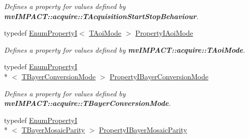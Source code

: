 \begin{DoxyCompactItemize}
\begin{DoxyCompactList}\small\item\em Defines a property for values defined by {\bfseries mv\+I\+M\+P\+A\+C\+T\+::acquire\+::\+T\+Acquisition\+Start\+Stop\+Behaviour}. \end{DoxyCompactList}\item 
\hypertarget{group___common_interface_gac29dd0ca928e4e97eeb1a038ddb4f2af}{typedef \hyperlink{classmv_i_m_p_a_c_t_1_1acquire_1_1_enum_property_i}{Enum\+Property\+I}$<$ \hyperlink{group___common_interface_gae7940d967323243f7d4ebdb5cc8045cb}{T\+Aoi\+Mode} $>$ \hyperlink{group___common_interface_gac29dd0ca928e4e97eeb1a038ddb4f2af}{Property\+I\+Aoi\+Mode}}\label{group___common_interface_gac29dd0ca928e4e97eeb1a038ddb4f2af}

\begin{DoxyCompactList}\small\item\em Defines a property for values defined by {\bfseries mv\+I\+M\+P\+A\+C\+T\+::acquire\+::\+T\+Aoi\+Mode}. \end{DoxyCompactList}\item 
\hypertarget{group___common_interface_ga0420d9b31df0caf0bc62286439e80366}{typedef \hyperlink{classmv_i_m_p_a_c_t_1_1acquire_1_1_enum_property_i}{Enum\+Property\+I}\\*
$<$ \hyperlink{group___common_interface_gab19b45fcaaa584be84a99a3d7098b055}{T\+Bayer\+Conversion\+Mode} $>$ \hyperlink{group___common_interface_ga0420d9b31df0caf0bc62286439e80366}{Property\+I\+Bayer\+Conversion\+Mode}}\label{group___common_interface_ga0420d9b31df0caf0bc62286439e80366}

\begin{DoxyCompactList}\small\item\em Defines a property for values defined by {\bfseries mv\+I\+M\+P\+A\+C\+T\+::acquire\+::\+T\+Bayer\+Conversion\+Mode}. \end{DoxyCompactList}\item 
\hypertarget{group___common_interface_gafaa3668c30761b139d7ff110ac2c83e4}{typedef \hyperlink{classmv_i_m_p_a_c_t_1_1acquire_1_1_enum_property_i}{Enum\+Property\+I}\\*
$<$ \hyperlink{group___common_interface_ga9e2a1b46f3ed21b46b867c6d88d25598}{T\+Bayer\+Mosaic\+Parity} $>$ \hyperlink{group___common_interface_gafaa3668c30761b139d7ff110ac2c83e4}{Property\+I\+Bayer\+Mosaic\+Parity}}\label{group___common_interface_gafaa3668c30761b139d7ff110ac2c83e4}


\end{DoxyCompactItemize}
